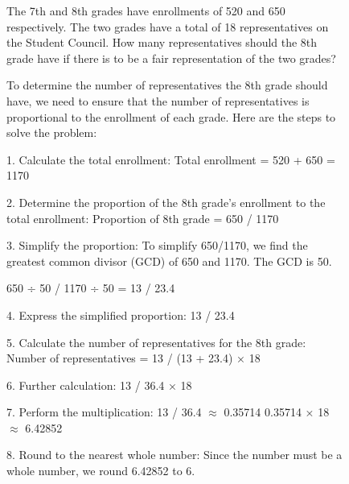 \documentclass{llmxive}
\begin{document}
\begin{figure}[h]
\centering
  
\begin{tcolorbox}[
    colback=gray!5!white, 
    colframe=brown!75!brown, 
    title=Case-1 from MATH,
    boxrule=0.3mm, 
    width=\linewidth,  
    arc=2mm, 
    auto outer arc=true
]
The 7th and 8th grades have enrollments of 520 and 650 respectively. The two grades have a total of 18 representatives on the Student Council. How many representatives should the 8th grade have if there is to be a fair representation of the two grades?
\end{tcolorbox}

\vspace{0.2cm}   
 
\begin{minipage}[t]{0.48\linewidth} 
    \begin{tcolorbox}[
        colback=gray!5!white, 
        colframe=red!75!brown, 
        title=Wrong Rollout, 
        boxrule=0.3mm, 
        width=\linewidth, 
        arc=2mm, 
        height=18cm,
        auto outer arc=true,
        top=2mm, bottom=2mm, left=2mm, right=2mm 
    ]
To determine the number of representatives the 8th grade should have, we need 
to ensure that the number of representatives is proportional to the enrollment 
of each grade. Here are the steps to solve the problem:

1. Calculate the total enrollment:
   Total enrollment = 520 + 650 = 1170

2. Determine the proportion of the 8th grade's enrollment to the total enrollment:
   Proportion of 8th grade = 650 / 1170

3. Simplify the proportion:
   To simplify 650/1170, we find the greatest common divisor (GCD) of 650 and 
   1170. The GCD is 50.
   
   650 ÷ 50 / 1170 ÷ 50 = 13 / 23.4   

4. Express the simplified proportion:
   13 / 23.4

5. Calculate the number of representatives for the 8th grade:
   Number of representatives = 13 / (13 + 23.4) × 18

6. Further calculation:
   13 / 36.4 × 18

7. Perform the multiplication:
   13 / 36.4 $\approx$ 0.35714
   0.35714 × 18 $\approx$ 6.42852

8. Round to the nearest whole number:
   Since the number must be a whole number, we round 6.42852 to 6.


\end{tcolorbox}
\end{minipage}
\end{figure}
\end{document}
